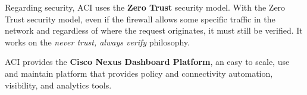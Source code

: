 Regarding security, ACI uses the \textbf{Zero Trust} security model. With the Zero Trust security model, even if the firewall allows some specific traffic in the network and regardless of where the request originates, it must still be verified. It works on the \textit{never trust, always verify} philosophy.

ACI provides the \textbf{Cisco Nexus Dashboard Platform}, an easy to scale, use and maintain platform that provides policy and connectivity automation, visibility, and analytics tools.